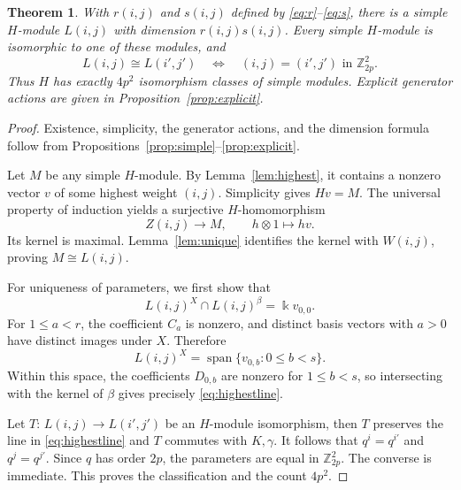 \documentclass[10pt,oneside]{amsart}
\newcommand{\kk}{\Bbbk}
\newcommand{\Z}{\mathbb Z}
\newcommand{\Span}{\operatorname{span}}
\newtheorem{theorem}[proposition]{Theorem}
\theoremstyle{definition}
\begin{document}
\begin{theorem}\label{thm:classification}
With $r(i,j)$ and $s(i,j)$ defined by \eqref{eq:r}--\eqref{eq:s},
there is a simple $H$-module $L(i,j)$ with dimension $r(i,j)s(i,j)$. Every simple $H$-module is isomorphic to one of these modules, and
\[
 L(i,j)\cong L(i',j')\quad\Longleftrightarrow\quad
 (i,j)=(i',j')\text{ in }\Z_{2p}^2.
\]
Thus $H$ has exactly $4p^2$ isomorphism classes of simple modules. Explicit generator actions are given in Proposition~\ref{prop:explicit}.
\end{theorem}
\begin{proof}
Existence, simplicity, the generator actions, and the dimension formula follow from Propositions~\ref{prop:simple}--\ref{prop:explicit}.

Let $M$ be any simple $H$-module. By Lemma~\ref{lem:highest}, it contains a nonzero vector $v$ of some highest weight $(i,j)$. Simplicity gives $Hv=M$. The universal property of induction yields a surjective $H$-homomorphism
\[
 Z(i,j)\longrightarrow M,\qquad h\otimes1\longmapsto hv.
\]
Its kernel is maximal. Lemma~\ref{lem:unique} identifies the kernel with $W(i,j)$, proving $M\cong L(i,j)$.

For uniqueness of parameters, we first show that
\begin{equation}
 L(i,j)^X\cap L(i,j)^\beta=\kk v_{0,0}.
 \label{eq:highestline}
\end{equation}
For $1\le a<r$, the coefficient $C_a$ is nonzero, and distinct basis vectors with $a>0$ have distinct images under $X$. Therefore
\[
 L(i,j)^X=\Span\{v_{0,b}:0\le b<s\}.
\]
Within this space, the coefficients $D_{0,b}$ are nonzero for $1\le b<s$, so intersecting with the kernel of $\beta$ gives precisely \eqref{eq:highestline}.

 Let $T$: $L(i,j)\to L(i',j')$ be an $H$-module isomorphism, then $T$ preserves the line in \eqref{eq:highestline} and $T$ commutes with $K,\gamma$. It follows that $q^i=q^{i'}$ and $q^j=q^{j'}$. Since $q$ has order $2p$, the parameters are equal in $\Z_{2p}^2$. The converse is immediate. This proves the classification and the count $4p^2$.
\end{proof}
\end{document}
